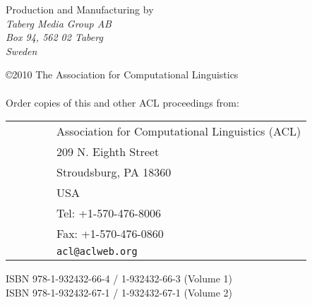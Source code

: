 \documentclass[11pt]{article}
\begin{document}
\noindent Production and Manufacturing by \\
{\em Taberg Media Group AB\\
Box 94, 562 02 Taberg\\
Sweden}

%
%

\vspace*{3.5in}
\large
\noindent
\copyright 2010 The Association for Computational Linguistics\\
\hspace*{6.5mm} \\

\vspace*{0.6in}
\noindent Order copies of this and other ACL proceedings from: \\
\vspace*{3mm}

\begin{tabular}{ll}
\ \ \ \ \ \ & Association for Computational Linguistics (ACL) \\
& 209 N. Eighth Street \\
& Stroudsburg, PA 18360 \\
& USA \\
& Tel: +1-570-476-8006 \\
& Fax: +1-570-476-0860 \\
& {\tt acl@aclweb.org} \\
\end{tabular}

\vspace*{6mm}
\noindent ISBN 978-1-932432-66-4 / 1-932432-66-3 (Volume 1)\\
\noindent ISBN 978-1-932432-67-1 / 1-932432-67-1 (Volume 2)\\
\end{document}
